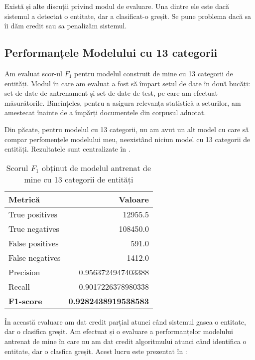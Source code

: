 Există și alte discuții privind modul de evaluare. Una dintre ele este dacă sistemul a detectat o entitate, dar a clasificat-o greșit. Se pune problema dacă sa îi dăm credit sau sa penalizăm sistemul.

\subsection{Performanțele Modelului cu 13 categorii}

Am evaluat scor-ul $F_1$ pentru modelul construit de mine cu 13 categorii de entități. Modul în care am evaluat a fost să împart setul de date în două bucăți: set de date de antrenament și set de date de test, pe care am efectuat măsurătorile. Bineînțeles, pentru a asigura relevanța statistică a seturilor, am amestecat înainte de a împărți documentele din corpusul adnotat.


Din păcate, pentru modelul cu 13 categorii, nu am avut un alt model cu care să compar perfomențele modelului meu, neexistând niciun model cu 13 categorii de entități. Rezultatele sunt centralizate în .


\begin{center}
\begin{table}[htb]
  \caption{Scorul $F_1$ obținut de modelul antrenat de mine cu 13 categorii de entități}
  \begin{tabular}{|l|r|}
  \hline
   Metrică & Valoare\\
   \hline
  True positives & 12955.5 \\
  True negatives & 108450.0 \\
  False positives & 591.0 \\
  False negatives & 1412.0 \\
    \hline
  Precision & 0.9563724947403388 \\
  Recall & 0.9017226378980338 \\
  \hline
  \textbf{F1-score} & \textbf{0.9282438919538583} \\
   \hline
   
  \end{tabular}
  \label{table:f1-score-13-class}
\end{table}
\end{center}

În această evaluare am dat credit parțial atunci când sistemul gasea o entitate, dar o clasifica greșit. Am efectuat și o evaluare a performanțelor modelului antrenat de mine în care nu am dat credit algoritmului atunci când identifica o entitate, dar o clasfica greșit. Acest lucru este prezentat în :

